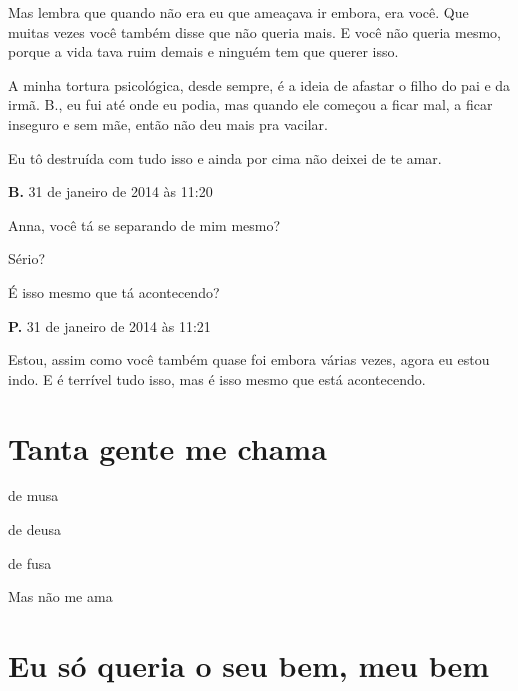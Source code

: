 {Mas lembra que quando não era eu que ameaçava ir embora, era você. Que
muitas vezes você também disse que não queria mais. E você não queria
mesmo, porque a vida tava ruim demais e ninguém tem que querer isso.

A minha tortura psicológica, desde sempre, é a ideia de afastar o filho
do pai e da irmã. B., eu fui até onde eu podia, mas quando ele começou a
ficar mal, a ficar inseguro e sem mãe, então não deu mais pra vacilar.

Eu tô destruída com tudo isso e ainda por cima não deixei de te amar.

\textbf{B.} 31 de janeiro de 2014 às 11:20

Anna, você tá se separando de mim mesmo?

Sério?

É isso mesmo que tá acontecendo?

\textbf{P.} 31 de janeiro de 2014 às 11:21

Estou, assim como você também quase foi embora várias vezes, agora eu
estou indo. E é terrível tudo isso, mas é isso mesmo que está
acontecendo.
}

\chapter{Tanta gente me chama}

{\parindent0pt
de musa

de deusa

de fusa

Mas não me ama
}


\chapter{Eu só queria o seu bem, meu bem}

